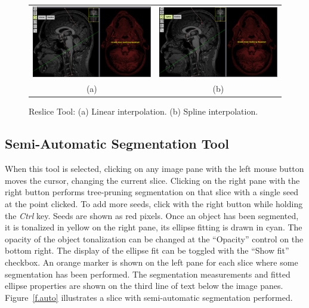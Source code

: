 \documentclass[12pt]{report}
\begin{document}
\begin{figure}[!htb]
\begin{center}
\begin{tabular}{cc}
\includegraphics[width=.47\textwidth]{reslice1.eps} & %
\includegraphics[width=.47\textwidth]{reslice2.eps} \\ 
(a) & (b)
\end{tabular}
\caption{Reslice Tool: (a) Linear interpolation. (b) Spline interpolation.}
\label{f.reslice}
\end{center}\end{figure}

\subsection{Semi-Automatic Segmentation Tool}

When this tool is selected, clicking on any image pane with the left
mouse button moves the cursor, changing the current slice. Clicking on
the right pane with the right button performs tree-pruning
segmentation on that slice with a single seed at the point clicked. To
add more seeds, click with the right button while holding the
\emph{Ctrl} key. Seeds are shown as red pixels.  Once an object has
been segmented, it is tonalized in yellow on the right pane, its
ellipse fitting is drawn in cyan. The opacity of the object
tonalization can be changed at the ``Opacity'' control on the bottom
right. The display of the ellipse fit can be toggled with the ``Show
fit'' checkbox. An orange marker is shown on the left pane for each
slice where some segmentation has been performed. The segmentation
measurements and fitted ellipse properties are shown on the third line
of text below the image panes. Figure~\ref{f.auto} illustrates a slice
with semi-automatic segmentation performed.
\end{document}
